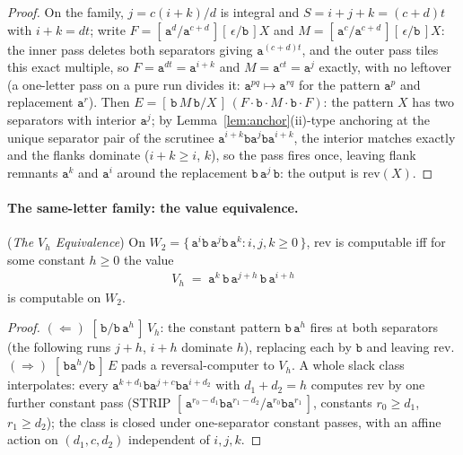 \documentclass[runningheads,envcountsect]{llncs}
\begin{document}
\begin{proof}
    On the family, $j = c(i+k)/d$ is integral and $S = i + j + k = (c+d)t$ with $i + k = dt$; write $F = [\,\mathtt a^d/\mathtt a^{c+d}\,][\,\epsilon/\mathtt b\,]X$ and $M = [\,\mathtt a^c/\mathtt a^{c+d}\,][\,\epsilon/\mathtt b\,]X$: the inner pass deletes both separators giving $\mathtt a^{(c+d)t}$, and the outer pass tiles this exact multiple, so $F = \mathtt a^{dt} = \mathtt a^{i+k}$ and $M = \mathtt a^{ct} = \mathtt a^{j}$ exactly, with no leftover (a one-letter pass on a pure run divides it: $\mathtt a^{p q} \mapsto \mathtt a^{r q}$ for the pattern $\mathtt a^p$ and replacement $\mathtt a^r$). Then $E = [\,\mathtt b\,M\,\mathtt b/X\,]\,(F \cdot \mathtt b \cdot M \cdot \mathtt b \cdot F)$: the pattern $X$ has two separators with interior $\mathtt a^j$; by Lemma~\ref{lem:anchor}(ii)-type anchoring at the unique separator pair of the scrutinee $\mathtt a^{i+k} \mathtt b \mathtt a^{j} \mathtt b \mathtt a^{i+k}$, the interior matches exactly and the flanks dominate ($i + k \geq i$, $k$), so the pass fires once, leaving flank remnants $\mathtt a^{k}$ and $\mathtt a^{i}$ around the replacement $\mathtt b\,\mathtt a^{j}\,\mathtt b$: the output is $\mathrm{rev}(X)$.
\end{proof}

\paragraph{The same-letter family: the value equivalence.}

\begin{proposition}
    (\emph{The $V_h$ Equivalence})
    \label{prop:vh}
    On $W_2 = \{\, \mathtt a^i \mathtt b\, \mathtt a^j \mathtt b\, \mathtt a^k : i, j, k \geq 0 \,\}$, $\mathrm{rev}$ is computable iff for some constant $h \geq 0$ the value
    \begin{align*}
        V_h \;=\; \mathtt a^{k}\,\mathtt b\,\mathtt a^{j+h}\,\mathtt b\,\mathtt a^{i+h}
    \end{align*}
    is computable on $W_2$.
\end{proposition}

\begin{proof}
    $(\Leftarrow)$ $[\,\mathtt b/\mathtt b\,\mathtt a^{h}\,]\,V_h$: the constant pattern $\mathtt b\,\mathtt a^{h}$ fires at both separators (the following runs $j+h$, $i+h$ dominate $h$), replacing each by $\mathtt b$ and leaving $\mathrm{rev}$. $(\Rightarrow)$ $[\,\mathtt b \mathtt a^{h}/\mathtt b\,]\,E$ pads a reversal-computer to $V_h$. A whole slack class interpolates: every $\mathtt a^{k+d_1} \mathtt b \mathtt a^{j+c} \mathtt b \mathtt a^{i+d_2}$ with $d_1 + d_2 = h$ computes $\mathrm{rev}$ by one further constant pass ($\mathrm{STRIP}$ $[\,\mathtt a^{r_0-d_1} \mathtt b \mathtt a^{r_1-d_2}/\mathtt a^{r_0} \mathtt b \mathtt a^{r_1}\,]$, constants $r_0 \geq d_1$, $r_1 \geq d_2$); the class is closed under one-separator constant passes, with an affine action on $(d_1, c, d_2)$ independent of $i, j, k$.
\end{proof}
\end{document}
